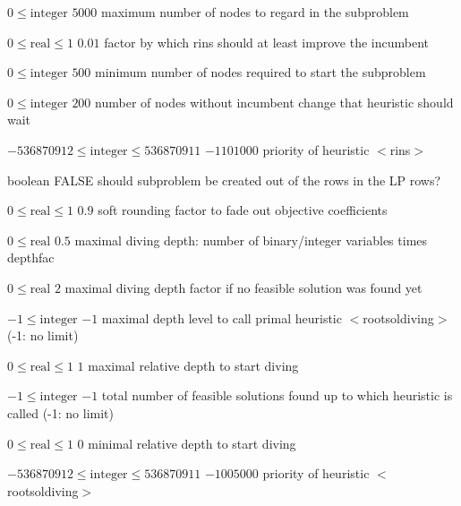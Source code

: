 %
{$0\leq\textrm{integer}$}%
{$5000$}%
{maximum number of nodes to regard in the subproblem}%
{}

%
{$0\leq\textrm{real}\leq1$}%
{$0.01$}%
{factor by which rins should at least improve the incumbent}%
{}

%
{$0\leq\textrm{integer}$}%
{$500$}%
{minimum number of nodes required to start the subproblem}%
{}

%
{$0\leq\textrm{integer}$}%
{$200$}%
{number of nodes without incumbent change that heuristic should wait}%
{}

%
{$-536870912\leq\textrm{integer}\leq536870911$}%
{$-1101000$}%
{priority of heuristic $<$rins$>$}%
{}

%
{boolean}%
{FALSE}%
{should subproblem be created out of the rows in the LP rows?}%
{}

%
{$0\leq\textrm{real}\leq1$}%
{$0.9$}%
{soft rounding factor to fade out objective coefficients}%
{}

%
{$0\leq\textrm{real}$}%
{$0.5$}%
{maximal diving depth: number of binary/integer variables times depthfac}%
{}

%
{$0\leq\textrm{real}$}%
{$2$}%
{maximal diving depth factor if no feasible solution was found yet}%
{}

%
{$-1\leq\textrm{integer}$}%
{$-1$}%
{maximal depth level to call primal heuristic $<$rootsoldiving$>$ (-1: no limit)}%
{}

%
{$0\leq\textrm{real}\leq1$}%
{$1$}%
{maximal relative depth to start diving}%
{}

%
{$-1\leq\textrm{integer}$}%
{$-1$}%
{total number of feasible solutions found up to which heuristic is called (-1: no limit)}%
{}

%
{$0\leq\textrm{real}\leq1$}%
{$0$}%
{minimal relative depth to start diving}%
{}

%
{$-536870912\leq\textrm{integer}\leq536870911$}%
{$-1005000$}%
{priority of heuristic $<$rootsoldiving$>$}%
{}

